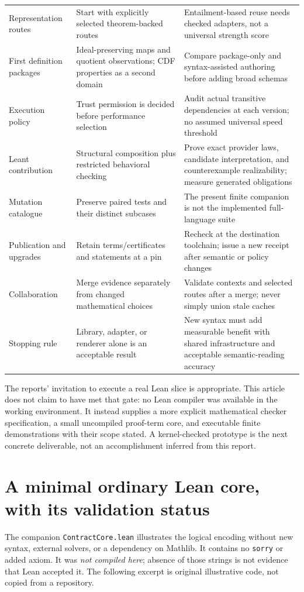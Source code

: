 \documentclass[11pt,a4paper]{article}
\newcommand{\code}[1]{\nolinkurl{#1}}
\theoremstyle{plain}
\theoremstyle{definition}
\theoremstyle{remark}
\begin{document}
{\begin{longtable}{@{}P{29mm}P{45mm}P{71mm}@{}}
Representation routes & Start with explicitly selected theorem-backed routes & Entailment-based reuse needs checked adapters, not a universal strength score\\
First definition packages & Ideal-preserving maps and quotient observations; CDF properties as a second domain & Compare package-only and syntax-assisted authoring before adding broad schemas\\
Execution policy & Trust permission is decided before performance selection & Audit actual transitive dependencies at each version; no assumed universal speed threshold\\
Leant contribution & Structural composition plus restricted behavioral checking & Prove exact provider laws, candidate interpretation, and counterexample realizability; measure generated obligations\\
Mutation catalogue & Preserve paired tests and their distinct subcases & The present finite companion is not the implemented full-language suite\\
Publication and upgrades & Retain terms/certificates and statements at a pin & Recheck at the destination toolchain; issue a new receipt after semantic or policy changes\\
Collaboration & Merge evidence separately from changed mathematical choices & Validate contexts and selected routes after a merge; never simply union stale caches\\
Stopping rule & Library, adapter, or renderer alone is an acceptable result & New syntax must add measurable benefit with shared infrastructure and acceptable semantic-reading accuracy\\
\end{longtable}}

The reports' invitation to execute a real Lean slice is appropriate. This
article does not claim to have met that gate: no Lean compiler was available
in the working environment. It instead supplies a more explicit mathematical
checker specification, a small uncompiled proof-term core, and executable
finite demonstrations with their scope stated. A kernel-checked prototype is
the next concrete deliverable, not an accomplishment inferred from this report.

\section{A minimal ordinary Lean core, with its validation status}
\label{app:lean}
The companion \code{ContractCore.lean} illustrates the logical encoding without
new syntax, external solvers, or a dependency on Mathlib. It contains no
\code{sorry} or added axiom. It was \emph{not compiled here}; absence of those
strings is not evidence that Lean accepted it. The following excerpt is
original illustrative code, not copied from a repository.
\end{document}
